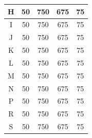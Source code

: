 \begin{center}
\begin{longtable}[c]{|c|c|c|c|c|}
  H              & 50                    & 750                     & 675                                                                       & 75                                                                             \\ \hline
  I              & 50                    & 750                     & 675                                                                       & 75                                                                             \\ \hline
  J              & 50                    & 750                     & 675                                                                       & 75                                                                             \\ \hline
  K              & 50                    & 750                     & 675                                                                       & 75                                                                             \\ \hline
  L              & 50                    & 750                     & 675                                                                       & 75                                                                             \\ \hline
  M              & 50                    & 750                     & 675                                                                       & 75                                                                             \\ \hline
  N              & 50                    & 750                     & 675                                                                       & 75                                                                             \\ \hline
  P              & 50                    & 750                     & 675                                                                       & 75                                                                             \\ \hline
  R              & 50                    & 750                     & 675                                                                       & 75                                                                             \\ \hline
  S              & 50                    & 750                     & 675                                                                       & 75                                                                             \\ \hline

\end{longtable}
\end{center}
